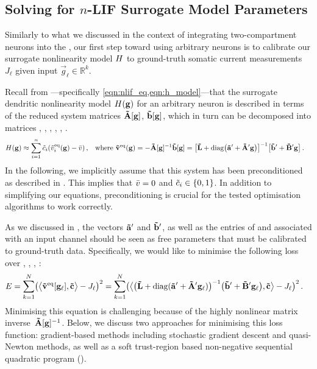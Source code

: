 \subsection{Solving for $n$-LIF Surrogate Model Parameters}
\label{sec:nlif_opt_parameters}

Similarly to what we discussed in the context of integrating two-compartment neurons into the \NEF, our first step toward using arbitrary \nlif neurons is to calibrate our surrogate nonlinearity model ${H}$ to ground-truth somatic current measurements $J_\ell$ given input $\vec g_\ell \in \mathbb{R}^k$.

Recall from ---specifically \cref{eqn:nlif_eq,eqn:h_model}---that the surrogate dendritic nonlinearity model ${H}(\mathbf{g})$ for an arbitrary \nlif neuron is described in terms of the reduced system matrices $\mathbf{\tilde A}[\mathbf{g}]$, $\mathbf{\tilde b}[\mathbf{g}]$, which in turn can be decomposed into matrices \mrL, \vrap, \mrAp, \vrbp, \mrBp, \vrc.
\begin{align*}
	{\ensuremath{H}}(\mathbf{g})
		&\approx \sum_{i = 1}^n {\tilde c}_i ({\tilde v}_i^\mathrm{eq}(\mathbf{g}) - {{\bar v}}) \,,
		& \text{where } \mathbf{\tilde v}^\mathrm{eq}(\mathbf{g})
			&= -{\mathbf{\tilde A}}[\mathbf{g}]^{-1} \mathbf{\tilde b}[\mathbf{g}]
			 = \bigl[\mathbf{\tilde L} + \operatorname{\mathrm{diag}}\bigl(\mathbf{\tilde a}' + \mathbf{\tilde A}' \mathbf{g}\bigr) \bigr]^{-1} \bigl[ \mathbf{\tilde b}' + \mathbf{\tilde B}' \mathbf{g} \bigr] \,.
\end{align*}
In the following, we implicitly assume that this system has been preconditioned as described in .
This implies that ${{\bar v}} = 0$ and ${\tilde c}_i \in \{0, 1\}$.
In addition to simplifying our equations, preconditioning is crucial for the tested optimisation algorithms to work correctly.

As we discussed in , the vectors $\mathbf{\tilde a}'$ and $\mathbf{\tilde b}'$, as well as the entries of \mrAp and \mrBp associated with an input channel should be seen as free parameters that must be calibrated to ground-truth data.
Specifically, we would like to minimise the following loss over \vrap, \mrAp, \vrbp, \mrBp:
\begin{align}
	\begin{aligned}
	E %
	  &= \sum_{k = 1}^N \bigl(
	   	   	\bigl\langle
	   	   		\vreq[\vec g_\ell],
	   	   		\vrc
	   	   	\bigr\rangle
	   	   	 - J_\ell \bigr)^2
	  = \sum_{k = 1}^N \bigl(
	   	\bigl\langle
	   		\bigl(\mrL + \diag(\vrap + \mrAp \vec g_\ell) \bigr)^{-1} \bigl(\vrbp + \mrBp \vec g_\ell  \bigr),
	   		\vrc
	   	\bigr\rangle
	   	 - J_\ell \bigr)^2 \,.
	\end{aligned}
	\label{eqn:nlif_param_opt}	
\end{align}
Minimising this equation is challenging because of the highly nonlinear matrix inverse~$\mathbf{\tilde A}[\mathbf{g}]^{-1}$.
Below, we discuss two approaches for minimising this loss function: gradient-based methods including stochastic gradient descent and quasi-Newton methods, as well as a soft trust-region based non-negative sequential quadratic program (\SQP).

